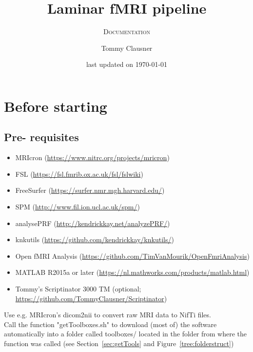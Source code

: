 \documentclass[12pt,a4paper]{scrartcl}
\title{Laminar fMRI pipeline}
\author{Tommy Clausner}
\subtitle{\textsc{Documentation}}
\date{\small{last updated on \today}}
\begin{document}
\begin{titlepage}
\clearpage\maketitle
\thispagestyle{empty}
\end{titlepage}
\tableofcontents
\newpage
\listoffigures
\newpage
\listoftables
\newpage
\section{Before starting}
\subsection{Pre- requisites}
\label{sec:prereq}
\begin{itemize}
\item MRIcron (\href{https://www.nitrc.org/projects/mricron}{https://www.nitrc.org/projects/mricron})
\item FSL (\href{https://fsl.fmrib.ox.ac.uk/fsl/fslwiki}{https://fsl.fmrib.ox.ac.uk/fsl/fslwiki})
\item FreeSurfer (\href{https://surfer.nmr.mgh.harvard.edu/}{https://surfer.nmr.mgh.harvard.edu/})
\item SPM (\href{http://www.fil.ion.ucl.ac.uk/spm/}{http://www.fil.ion.ucl.ac.uk/spm/})
\item analysePRF (\href{http://kendrickkay.net/analyzePRF/}{http://kendrickkay.net/analyzePRF/})
\item knkutils (\href {https://github.com/kendrickkay/knkutils/}{https://github.com/kendrickkay/knkutils/})
\item Open fMRI Analysis (\href{https://github.com/TimVanMourik/OpenFmriAnalysis}{https://github.com/TimVanMourik/OpenFmriAnalysis})
\item MATLAB R2015a or later (\href{https://nl.mathworks.com/products/matlab.html}{https://nl.mathworks.com/products/matlab.html})
\item Tommy's Scriptinator 3000 TM (optional; \href{https://github.com/TommyClausner/Scriptinator}{https://github.com/TommyClausner/Scriptinator})
\end{itemize}

\noindent Use e.g. MRIcron's dicom2nii to convert raw MRI data to NifTi files.\\

\noindent Call the function "getToolboxes.sh" to download (most of) the software automatically into a folder called toolboxes/ located in the folder from where the function was called (see Section~\ref{sec:getTools} and Figure~\ref{tree:folderstruct})\\
\end{document}
